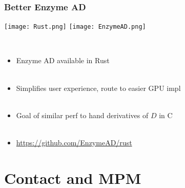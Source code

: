 \documentclass{beamer}
\begin{document}
\begin{frame}
\begin{center}
\frametitle{Better Enzyme AD}

\texttt{[image: Rust.png]} \hspace*{1cm} \texttt{[image: EnzymeAD.png]}

~\\

\begin{itemize}

\item Enzyme AD available in Rust\\

~\\

\item Simplifies user experience, route to easier GPU impl\\

~\\

\item Goal of similar perf to hand derivatives of {\color{applegreen}$D$} in C\\

~\\

\item \href{https://github.com/EnzymeAD/rust}{https://github.com/EnzymeAD/rust}\\

\end{itemize}

\end{center}
\end{frame}

\section{Contact and MPM}
\end{document}
